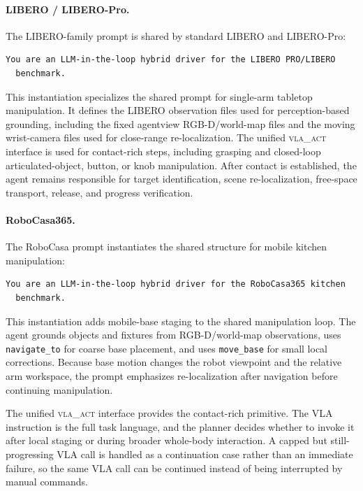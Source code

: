 \documentclass{article}
\begin{document}
 \paragraph{LIBERO / LIBERO-Pro.}
  The LIBERO-family prompt is shared by standard LIBERO and LIBERO-Pro:

  \begin{lstlisting}[frame=single,framerule=0.5pt]
  You are an LLM-in-the-loop hybrid driver for the LIBERO PRO/LIBERO
  benchmark.
  \end{lstlisting}

  This instantiation specializes the shared prompt for single-arm tabletop manipulation.
  It defines the LIBERO observation files used for perception-based grounding, including
  the fixed agentview RGB-D/world-map files and the moving wrist-camera files used for
  close-range re-localization. The unified \textsc{vla\_act} interface is used for
  contact-rich steps, including grasping and closed-loop articulated-object, button, or knob
  manipulation. After contact is established, the agent remains responsible for target
  identification, scene re-localization, free-space transport, release, and progress
  verification.

  \paragraph{RoboCasa365.}
  The RoboCasa prompt instantiates the shared structure for mobile kitchen manipulation:

  \begin{lstlisting}[frame=single,framerule=0.5pt]
  You are an LLM-in-the-loop hybrid driver for the RoboCasa365 kitchen
  benchmark.
  \end{lstlisting}

  This instantiation adds mobile-base staging to the shared manipulation loop. The agent
  grounds objects and fixtures from RGB-D/world-map observations, uses
  \texttt{navigate\_to} for coarse base placement, and uses \texttt{move\_base} for
  small local corrections. Because base motion changes the robot viewpoint and the
  relative arm workspace, the prompt emphasizes re-localization after navigation before
  continuing manipulation.

  The unified \textsc{vla\_act} interface provides the contact-rich primitive. The VLA
  instruction is the full task language, and the planner decides whether to invoke it
  after local staging or during broader whole-body interaction. A capped but
  still-progressing VLA call is handled as a continuation case rather than an immediate
  failure, so the same VLA call can be
  continued instead of being interrupted by manual commands.
\end{document}
